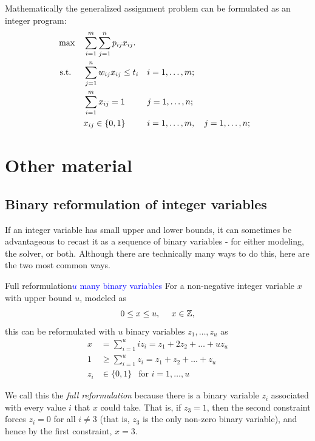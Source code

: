 Mathematically the generalized assignment problem can be formulated as
an integer program:
\begin{align*}
\max \quad & \sum_{i=1}^m\sum_{j=1}^n p_{ij} x_{ij}. \\
\mbox{ s.t. } \quad  & \sum_{j=1}^n w_{ij} x_{ij} \le t_i && i=1, \ldots, m; \\
& \sum_{i=1}^m x_{ij} = 1 && j=1, \ldots, n; \\
& x_{ij} \in \{0,1\} && i=1, \ldots, m, \quad j=1, \ldots, n;
\end{align*}

\section{Other material}

\subsection{Binary reformulation of integer variables}
If an integer variable has small upper and lower bounds, it can sometimes be advantageous to recast it as a sequence of binary variables - for either modeling, the solver, or both.   Although there are technically many ways to do this, here are the two most common ways.

\begin{general}{Full reformulation}{\textcolor{blue}{$u$ many binary variables}}
\label{general:full-reformulation}
For a non-negative integer variable $x$ with upper bound $u$, modeled as 
\begin{equation}
0 \leq x \leq u, \ \ \ \ x \in \mathbb{Z},
\end{equation}
this can be reformulated with $u$ binary variables $z_1, \dots, z_u$ as 
\begin{equation}
\begin{split}
x & = \sum_{i=1}^u i z_i = z_1 + 2 z_2 + \dots + u z_u\\
1 & \geq \sum_{i=1}^u z_i = z_1 + z_2 + \dots + z_u\\
z_i & \in \{0,1\} \ \ \text{ for } i=1, \dots, u
\end{split}
\end{equation}
\end{general}
We call this the \emph{full reformulation} because there is a binary variable $z_i$ associated with every value $i$ that $x$ could take.  That is, if $z_3 = 1$, then the second constraint forces $z_i = 0$ for all $i \neq 3$ (that is, $z_3$ is the only non-zero binary variable), and hence by the first constraint, $x = 3$.

